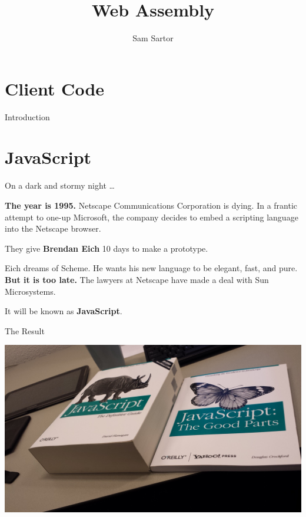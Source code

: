 \documentclass{lug}
\title{Web Assembly}
\author{Sam Sartor}
\institute{Mines Linux Users Group}
\begin{document}
\newcommand{\secimage}{graphics/html_icon}
\section{Client Code}

\begin{frame}{Introduction}

\end{frame}

\renewcommand{\secimage}{graphics/sad_js}
\section{JavaScript}

\begin{frame}{On a dark and stormy night \dots}
    \begin{center}

        \textbf{The year is 1995.} Netscape Communications Corporation is
        dying. In a frantic attempt to one-up Microsoft, the company decides to
        embed a scripting language into the Netscape browser.
        
        \vspace{2ex}
        
        They give \textbf{Brendan Eich} 10 days to make a prototype.

        \vspace{2ex}

        Eich dreams of Scheme. He wants his new language to be elegant, fast,
        and pure. \textbf{But it is too late.} The lawyers at Netscape have made a deal
        with Sun Microsystems.

        \vspace{2ex}
        
        It will be known as \textbf{JavaScript}.
    \end{center}
\end{frame}

\begin{frame}{The Result}
    \begin{center}
        \includegraphics[width=\textwidth]{graphics/js_the_good}
    \end{center}
\end{frame}
\end{document}
